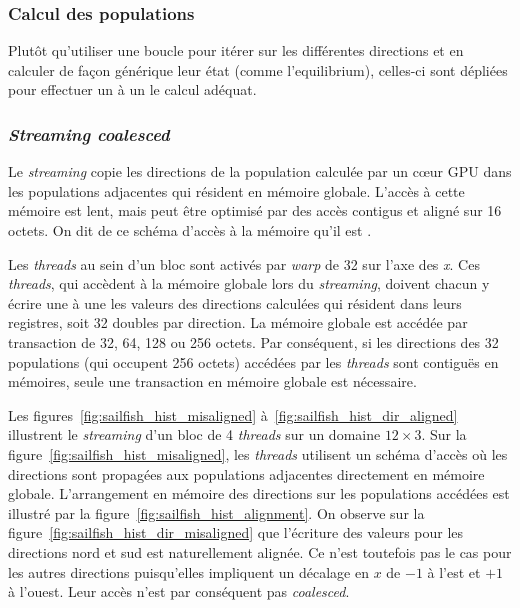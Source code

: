 \subsubsection{Calcul des populations}
Plutôt qu'utiliser une boucle pour itérer sur les différentes directions et en calculer de façon générique leur état (comme l'equilibrium), celles-ci sont dépliées pour effectuer un à un le calcul adéquat.

\subsubsection{\textit{Streaming coalesced}}\label{title-streaming-coalesced}
Le \textit{streaming} copie les directions de la population calculée par un cœur \acs{GPU} dans les populations adjacentes qui résident en mémoire globale. L'accès à cette mémoire est lent, mais peut être optimisé par des accès contigus et aligné sur 16 octets. On dit de ce schéma d'accès à la mémoire qu'il est .

Les \textit{threads} au sein d'un bloc sont activés par \textit{warp} de 32 sur l'axe des \textit{x}. Ces \textit{threads}, qui accèdent à la mémoire globale lors du \textit{streaming}, doivent chacun y écrire une à une les valeurs des directions calculées qui résident dans leurs registres, soit 32 doubles par direction. La mémoire globale est accédée par transaction de 32, 64, 128 ou 256 octets. Par conséquent, si les directions des 32 populations (qui occupent 256 octets) accédées par les \textit{threads} sont contiguës en mémoires, seule une transaction en mémoire globale est nécessaire. 

Les figures~\ref{fig:sailfish_hist_misaligned} à~\ref{fig:sailfish_hist_dir_aligned} illustrent le \textit{streaming} d'un bloc de 4 \textit{threads} sur un domaine $12 \times 3$.
Sur la figure~\ref{fig:sailfish_hist_misaligned}, les \textit{threads} utilisent un schéma d'accès où les directions sont propagées aux populations adjacentes directement en mémoire globale. L'arrangement en mémoire des directions sur les populations accédées est illustré par la figure~\ref{fig:sailfish_hist_alignment}. On observe sur la figure~\ref{fig:sailfish_hist_dir_misaligned} que l'écriture des valeurs pour les directions nord et sud est naturellement alignée. Ce n'est toutefois pas le cas pour les autres directions puisqu'elles impliquent un décalage en $x$ de $-1$ à l'est et $+1$ à l'ouest. Leur accès n'est par conséquent pas \textit{coalesced}.

